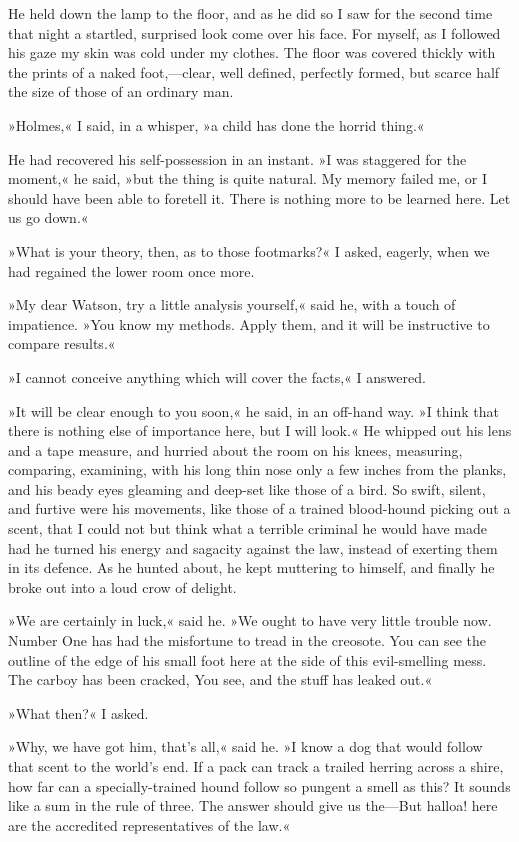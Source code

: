 He held down the lamp to the floor, and as he did so I saw for the second time that night a startled, surprised look come over his face. For myself, as I followed his gaze my skin was cold under my clothes. The floor was covered thickly with the prints of a naked foot,—clear, well defined, perfectly formed, but scarce half the size of those of an ordinary man.

»Holmes,« I said, in a whisper, »a child has done the horrid thing.«

He had recovered his self-possession in an instant. »I was staggered for the moment,« he said, »but the thing is quite natural. My memory failed me, or I should have been able to foretell it. There is nothing more to be learned here. Let us go down.«

»What is your theory, then, as to those footmarks?« I asked, eagerly, when we had regained the lower room once more.

»My dear Watson, try a little analysis yourself,« said he, with a touch of impatience. »You know my methods. Apply them, and it will be instructive to compare results.«

»I cannot conceive anything which will cover the facts,« I answered.

»It will be clear enough to you soon,« he said, in an off-hand way. »I think that there is nothing else of importance here, but I will look.« He whipped out his lens and a tape measure, and hurried about the room on his knees, measuring, comparing, examining, with his long thin nose only a few inches from the planks, and his beady eyes gleaming and deep-set like those of a bird. So swift, silent, and furtive were his movements, like those of a trained blood-hound picking out a scent, that I could not but think what a terrible criminal he would have made had he turned his energy and sagacity against the law, instead of exerting them in its defence. As he hunted about, he kept muttering to himself, and finally he broke out into a loud crow of delight.

»We are certainly in luck,« said he. »We ought to have very little trouble now. Number One has had the misfortune to tread in the creosote. You can see the outline of the edge of his small foot here at the side of this evil-smelling mess. The carboy has been cracked, You see, and the stuff has leaked out.«

»What then?« I asked.

»Why, we have got him, that's all,« said he. »I know a dog that would follow that scent to the world's end. If a pack can track a trailed herring across a shire, how far can a specially-trained hound follow so pungent a smell as this? It sounds like a sum in the rule of three. The answer should give us the—But halloa! here are the accredited representatives of the law.«


